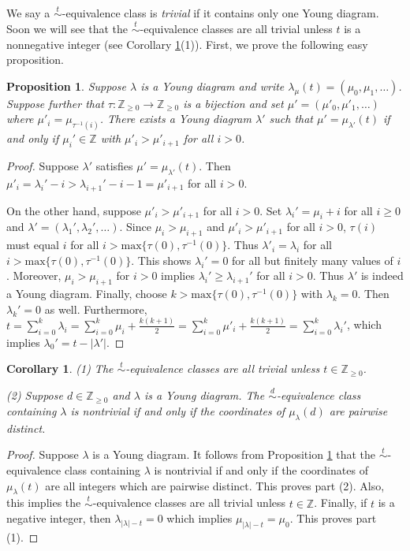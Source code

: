 \documentclass{amsart}
\newtheorem{proposition}[theorem]{Proposition}
\newtheorem{corollary}[theorem]{Corollary}
\theoremstyle{definition}
\renewcommand{\1}{_{(1)}}
\renewcommand{\2}{_{(2)}}
\newcommand{\3}{_{(3)}}
\newcommand{\4}{_{(4)}}
\newcommand{\Z}{\mathbb{Z}}
\begin{document}
We say a $\stackrel{t}{\sim}$-equivalence class is \emph{trivial} if it contains only one Young diagram.  Soon we will see that the $\stackrel{t}{\sim}$-equivalence classes are all trivial unless $t$ is a nonnegative integer (see Corollary \ref{gensim}(1)).  First, we prove the following easy proposition.

\begin{proposition}\label{gs}  Suppose $\lambda$ is a Young diagram and write $\lambda_\mu(t)=(\mu_0, \mu_1,\ldots)$.  Suppose further that $\tau:\Z_{\geq 0}\to\Z_{\geq 0}$ is a bijection and set $\mu'=(\mu'_0, \mu'_1,\ldots)$ where $\mu'_{i}=\mu_{\tau^{-1}(i)}$.  There exists a Young diagram $\lambda'$ such that $\mu'=\mu_{\lambda'}(t)$ if and only if $\mu_i'\in\Z$ with $\mu'_i>\mu'_{i+1}$ for all $i>0$.  
\end{proposition}

\begin{proof} Suppose $\lambda'$ satisfies $\mu'=\mu_{\lambda'}(t)$. Then $\mu'_i=\lambda_i'-i>\lambda_{i+1}'-i-1=\mu'_{i+1}$ for all $i>0$.  

On the other hand, suppose $\mu'_i>\mu'_{i+1}$ for all $i>0$.  Set $\lambda_i'=\mu_i+i$ for all $i\geq0$ and $\lambda'=(\lambda_1', \lambda_2',\ldots)$.  Since $\mu_i>\mu_{i+1}$ and $\mu'_i>\mu'_{i+1}$ for all $i>0$, $\tau(i)$ must equal $i$ for all $i>\text{max}\{\tau(0), \tau^{-1}(0)\}$.  Thus $\lambda'_i=\lambda_i$ for all $i>\text{max}\{\tau(0), \tau^{-1}(0)\}$.  This shows $\lambda_i'=0$ for all but finitely many values of $i$.  Moreover, $\mu_i>\mu_{i+1}$ for $i>0$ implies $\lambda_i'\geq\lambda_{i+1}'$ for all $i>0$.  Thus $\lambda'$ is indeed a Young diagram.   Finally, choose $k>\text{max}\{\tau(0), \tau^{-1}(0)\}$ with $\lambda_k=0$.  Then $\lambda_k'=0$ as well.  Furthermore, $t=\sum_{i=0}^k\lambda_i=\sum_{i=0}^k\mu_i+\frac{k(k+1)}{2}=\sum_{i=0}^k\mu'_i+\frac{k(k+1)}{2}=\sum_{i=0}^k\lambda_i'$, which implies $\lambda_0'=t-|\lambda'|$.
\end{proof}

\begin{corollary}\label{gensim} (1) The $\stackrel{t}{\sim}$-equivalence classes are all trivial unless $t\in\Z_{\geq0}$.

(2) Suppose $d\in\Z_{\geq0}$ and $\lambda$ is a Young diagram. The $\stackrel{d}{\sim}$-equivalence class containing $\lambda$ is nontrivial if and only if the coordinates of $\mu_\lambda(d)$ are pairwise distinct.
\end{corollary}

\begin{proof} Suppose $\lambda$ is a Young diagram.  It follows from Proposition \ref{gs} that the $\stackrel{t}{\sim}$-equivalence class containing $\lambda$ is nontrivial if and only if the coordinates of $\mu_\lambda(t)$ are all integers which are pairwise distinct.  This proves part (2).  Also, this implies the $\stackrel{t}{\sim}$-equivalence classes are all trivial unless $t\in\Z$.  Finally, if $t$ is a negative integer, then $\lambda_{|\lambda|-t}=0$ which implies $\mu_{|\lambda|-t}=\mu_0$.  This proves part (1). 
\end{proof}
\end{document}

